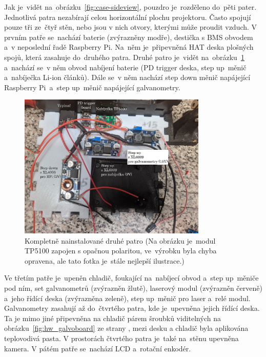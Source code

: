 Jak je~vidět na~obrázku~\ref{fig:case-sideview}, pouzdro je~rozděleno do~pěti pater. Jednotlivá patra nezabírají celou horizontální plochu projektoru. Často spojují pouze tři ze~čtyř stěn, nebo jsou v nich otvory, kterými může proudit vzduch. V prvním patře se~nachází baterie (zvýrazněny modře), destička s BMS obvodem a~v neposlední řadě Raspberry Pi.
Na~něm je~připevněná HAT deska plošných spojů, která zasahuje do~druhého patra. Druhé patro je~vidět na~obrázku~\ref{fig:hw_layer0} a~nachází se~v něm obvod nabíjení baterie (PD trigger deska, step up~měnič a~nabíječka Li-ion článků).
Dále se~v něm nachází step down měnič napájející Raspberry Pi~a~step up~měnič napájející galvanometry.
\begin{figure}[htb]
  \centering
  \includegraphics[width=0.8\textwidth]{img/hw_layer0.jpg}
  \caption{\label{fig:hw_layer0} Kompletně nainstalované druhé patro (Na obrázku je~modul TP5100 zapojen s opačnou polaritou, ve~výrobku byla chyba opravena, ale tato fotka je~stále nejlepší ilustrace.)}
\end{figure}

Ve třetím patře je~upeněn chladič, foukající na~nabíjecí obvod a~step up~měniče pod ním, set galvanometrů (zvýrazněn žlutě), laserový modul (zvýrazněn červeně) a~jeho řídící deska (zvýrazněna zeleně), step up~měnič pro laser a~relé modul.  
Galvanometry zasahují až do~čtvrtého patra, kde je~upevněna jejich řídící deska. Ta je mimo jiné připevněna na chladič párem šroubků viditelných na obrázku~\ref{fig:hw_galvoboard} ze strany \pageref{fig:hw_galvoboard}, mezi desku a chladič byla aplikována teplovodivá pasta. V prostorách čtvrtého patra je~také na~stěnu upevněna kamera.
V pátém patře se~nachází LCD a~rotační enkodér.

